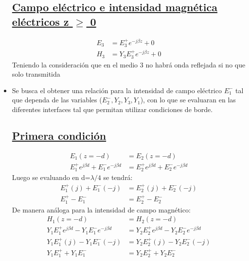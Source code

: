 \documentclass[
  11pt,
  letterpaper,
   addpoints,
   answers
  ]{exam}
\begin{document}
\begin{questions}
\begin{solution}
\begin{itemize}
\subsection*{\underline{Campo eléctrico e intensidad magnética eléctricos z $\geq$ 0}}
\begin{align}
    E_{3}&= E_{3}^{+}e^{-j\beta z} + 0\\
    H_{3}&= Y_{3}E_{3}^{+}e^{-j\beta z} + 0
\end{align}
Teniendo la consideración que en el medio 3 no habrá onda reflejada si no que solo transmitida
\item Se busca el obtener una relación para la intensidad de campo eléctrico $E_{1}^{-}$ tal que dependa de las variables ($E_{2}^{-}, Y_{2} , Y_{3} , Y_{1}$), con lo que se evaluaran en las diferentes interfaces tal que permitan utilizar condiciones de borde.
\subsection*{\underline{Primera condición}}
\begin{align}
    E_{1}(z=-d) &= E_{2}(z=-d)\\
    E_{1}^{+}e^{j\beta d} +E_{1}^{-}e^{-j\beta d} &= E_{2}^{+}e^{j\beta d} +E_{2}^{-}e^{-j\beta d}
\end{align}
Luego se evaluando en d=$\lambda/4$ se tendrá:
\begin{align}
    E_{1}^{+}(j)+ E_{1}^{-}(-j) &= E_{2}^{+}(j)+ E_{2}^{-}(-j)\\
    E_{1}^{+} -E_{1}^{-} &= E_{2}^{+}- E_{2}^{-}
\end{align}
De manera análoga para la intensidad de campo magnético:
\begin{align}
    H_{1}(z=-d) &= H_{2}(z=-d)\\
    Y_{1}E_{1}^{+}e^{j\beta d} -Y_{1}E_{1}^{-}e^{-j\beta d} &= Y_{2}E_{2}^{+}e^{j\beta d} -Y_{2}E_{2}^{-}e^{-j\beta d}\\
    Y_{1}E_{1}^{+}(j) - Y_{1}E_{1}^{-}(-j) &= Y_{2}E_{2}^{+}(j) - Y_{2}E_{2}^{-}(-j)\\
    Y_{1}E_{1}^{+} + Y_{1}E_{1}^{-} &= Y_{2}E_{2}^{+}+ Y_{2}E_{2}^{-}
\end{align}

\end{itemize}
\end{solution}
\end{questions}
\end{document}
